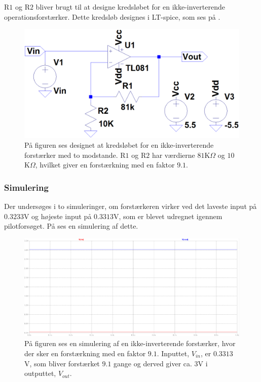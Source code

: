\noindent R$1$ og R$2$ bliver brugt til at designe kredsløbet for en ikke-inverterende operationsforstærker. Dette kredsløb designes i LT-spice, som ses på . 
\begin{figure}[H]
\centering
\includegraphics[scale=0.3]{figures/cProblemloesning/Forstaerker_faktor18.PNG}
\caption{På figuren ses designet at kredsløbet for en ikke-inverterende forstærker med to modstande. R$1$ og R$2$ har værdierne $81$K$\Omega$ og $10$K$\Omega$, hvilket giver en forstærkning med en faktor $9.1$.}
\label{fig:Forstaerker_faktor18}
\end{figure} 

\subsubsection{Simulering}\label{Subsec:Forstaerker_simu}
Der undersøges i to simuleringer, om forstærkeren virker ved det laveste input på $0.3233$V og højeste input på $0.3313$V, som er blevet udregnet igennem pilotforsøget. På  ses en simulering af dette.

\begin{figure}[H]
\centering
\includegraphics[scale=0.3]{figures/cProblemloesning/Forstaerker_faktor18_simulering.PNG}
\caption{På figuren ses en simulering af en ikke-inverterende forstærker, hvor der sker en forstærkning med en faktor $9.1$. Inputtet, $V_{in}$, er $0.3313$V, som bliver forstærket $9.1$ gange og derved giver ca. $3$V i outputtet, $V_{out}$.}
\label{fig:Forstaerker_faktor18_simulering}
\end{figure}

